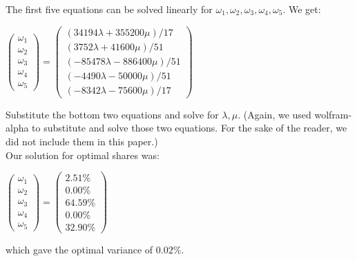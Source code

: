 \documentclass{article}
\begin{document}
The first five equations can be solved linearly for $\omega_1, \omega_2, \omega_3, \omega_4, \omega_5$. We get:
\begin{center}
    $\begin{pmatrix}
    \omega_1\\ \omega_2\\ \omega_3\\ \omega_4\\ \omega_5
    \end{pmatrix} = \begin{pmatrix}
    (34194\lambda +355200\mu)/17 \\
    (3752\lambda +41600\mu)/51 \\
    (-85478\lambda -886400\mu)/51\\
    (-4490\lambda -50000\mu)/51\\
    (-8342\lambda -75600\mu)/17
    \end{pmatrix}$
\end{center}
Substitute the bottom two equations and solve for $\lambda, \mu$. (Again, we used wolfram-alpha to substitute and solve those two equations. For the sake of the reader, we did not include them in this paper.)\\
Our solution for optimal shares was:
\begin{center}
    $\begin{pmatrix}
    \omega_1\\ \omega_2\\ \omega_3\\ \omega_4\\ \omega_5
    \end{pmatrix} =\begin{pmatrix}
    2.51\% \\ 0.00\% \\ 64.59\% \\ 0.00\% \\ 32.90\%
    \end{pmatrix}$
\end{center}
which gave the optimal variance of $0.02\%$.
\end{document}
